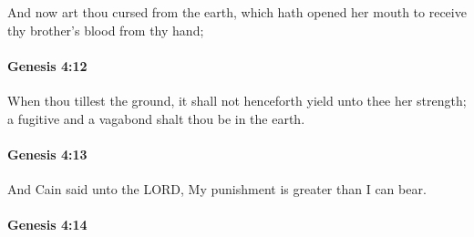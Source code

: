 			And now art thou cursed from the earth, which hath opened her mouth to receive thy brother's blood from thy hand;


		\paragraph{Genesis 4:12} %
			\label{GENESIS-4-12}

			When thou tillest the ground, it shall not henceforth yield unto thee her strength; a fugitive and a vagabond shalt thou be in the earth.


		\paragraph{Genesis 4:13} %
			\label{GENESIS-4-13}

			And Cain said unto the LORD, My punishment is greater than I can bear.


		\paragraph{Genesis 4:14} %
			\label{GENESIS-4-14}

